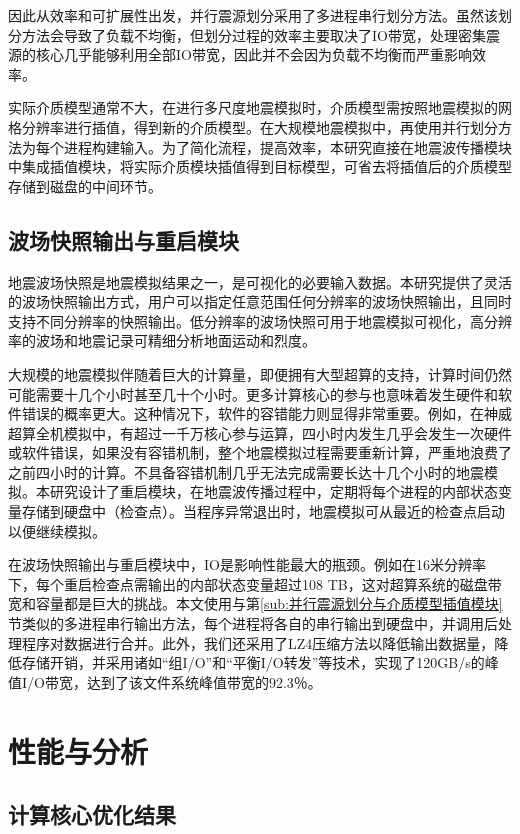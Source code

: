 \documentclass[degree=doctor]{thuthesis}
\begin{document}
因此从效率和可扩展性出发，并行震源划分采用了多进程串行划分方法。虽然该划分方法会导致了负载不均衡，但划分过程的效率主要取决了IO带宽，处理密集震源的核心几乎能够利用全部IO带宽，因此并不会因为负载不均衡而严重影响效率。

实际介质模型通常不大，在进行多尺度地震模拟时，介质模型需按照地震模拟的网格分辨率进行插值，得到新的介质模型。在大规模地震模拟中，再使用并行划分方法为每个进程构建输入。为了简化流程，提高效率，本研究直接在地震波传播模块中集成插值模块，将实际介质模块插值得到目标模型，可省去将插值后的介质模型存储到磁盘的中间环节。

\section{波场快照输出与重启模块}
地震波场快照是地震模拟结果之一，是可视化的必要输入数据。本研究提供了灵活的波场快照输出方式，用户可以指定任意范围任何分辨率的波场快照输出，且同时支持不同分辨率的快照输出。低分辨率的波场快照可用于地震模拟可视化，高分辨率的波场和地震记录可精细分析地面运动和烈度。

大规模的地震模拟伴随着巨大的计算量，即便拥有大型超算的支持，计算时间仍然可能需要十几个小时甚至几十个小时。更多计算核心的参与也意味着发生硬件和软件错误的概率更大。这种情况下，软件的容错能力则显得非常重要。例如，在神威超算全机模拟中，有超过一千万核心参与运算，四小时内发生几乎会发生一次硬件或软件错误，如果没有容错机制，整个地震模拟过程需要重新计算，严重地浪费了之前四小时的计算。不具备容错机制几乎无法完成需要长达十几个小时的地震模拟。本研究设计了重启模块，在地震波传播过程中，定期将每个进程的内部状态变量存储到硬盘中（检查点）。当程序异常退出时，地震模拟可从最近的检查点启动以便继续模拟。

在波场快照输出与重启模块中，IO是影响性能最大的瓶颈。例如在16米分辨率下，每个重启检查点需输出的内部状态变量超过108 TB，这对超算系统的磁盘带宽和容量都是巨大的挑战。本文使用与第\ref{sub:并行震源划分与介质模型插值模块}节类似的多进程串行输出方法，每个进程将各自的串行输出到硬盘中，并调用后处理程序对数据进行合并。此外，我们还采用了LZ4压缩方法以降低输出数据量，降低存储开销，并采用诸如“组I/O”和“平衡I/O转发”等技术，实现了120GB/s的峰值I/O带宽，达到了该文件系统峰值带宽的92.3％。

\chapter{性能与分析}
\section{计算核心优化结果}
\end{document}

